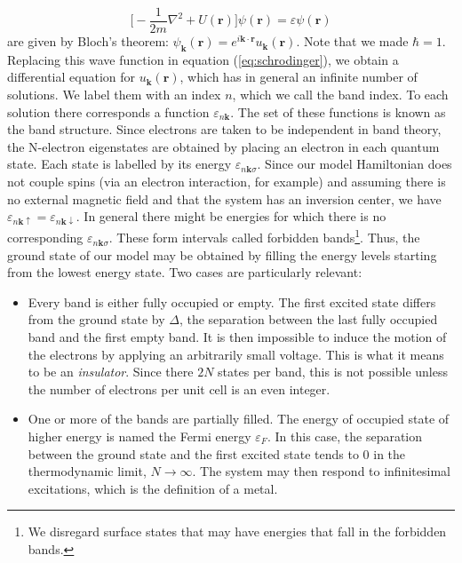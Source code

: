 \documentclass[10pt, twocolumn, twoside]{article}
\begin{document}
\begin{equation}\label{eq:schrodinger}
\bigg[ -\frac{1}{2m} \nabla^2 + U(\bm r) \bigg] \psi (\bm r) = \varepsilon \psi (\bm r)
\end{equation}
are given by Bloch's theorem: $\psi_{\bm k} (\bm r) = e^{i\bm k \cdot \bm r} u_{\bm k} (\bm r)$. Note that we made $\hbar = 1$. Replacing this wave function in equation (\ref{eq:schrodinger}), we obtain a differential equation for $u_{\bm k} (\bm r)$, which has in general an infinite number of solutions. We label them with an index $n$, which we call the band index. To each solution there corresponds a function $\varepsilon_{n\bm k}$. The set of these functions is known as the band structure. Since electrons are taken to be independent in band theory, the N-electron eigenstates are obtained by placing an electron in each quantum state. Each state is labelled by its energy $\varepsilon_{n\bm k \sigma}$. Since our model Hamiltonian does not couple spins (via an electron interaction, for example) and assuming there is no external magnetic field and that the system has an inversion center, we have $\varepsilon_{n\bm k \uparrow} = \varepsilon_{n\bm k \downarrow}$. In general there might be energies for which there is no corresponding $\varepsilon_{n\bm k \sigma}$. These form intervals called forbidden bands\footnote{We disregard surface states that may have energies that fall in the forbidden bands.}. Thus, the ground state of our model may be obtained by filling the energy levels starting from the lowest energy state. Two cases are particularly relevant:
\begin{itemize}
\item Every band is either fully occupied or empty. The first excited state differs from the ground state by $\Delta$, the separation between the last fully occupied band and the first empty band. It is then impossible to induce the motion of the electrons by applying an arbitrarily small voltage. This is what it means to be an \emph{insulator}. Since there $2N$ states per band, this is not possible unless the number of electrons per unit cell is an even integer.
\item One or more of the bands are partially filled. The energy of occupied state of higher energy is named the Fermi energy $\varepsilon_F$. In this case, the separation between the ground state and the first excited state tends to $0$ in the thermodynamic limit, $N \rightarrow \infty$. The system may then respond to infinitesimal excitations, which is the  definition of a metal.
\end{itemize}
\end{document}
